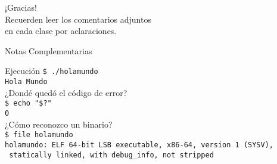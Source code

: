 \documentclass[aspectratio=169]{beamer}
\begin{document}

\begin{frame}[plain]
    \begin{center}
    \vspace{2cm}
    \huge ¡Gracias!\\
    \vspace{2cm}
    \normalsize Recuerden leer los comentarios adjuntos\\ en cada clase por aclaraciones.
    \end{center}
\end{frame}

\begin{frame}[plain]
    \begin{center}
    \vspace{2cm}
    \huge Notas Complementarias\\
    \vspace{2cm}
    \end{center}
\end{frame}

\begin{frame}[fragile,t]{Ejecución}
    \small
    \vspace{0.2cm}
        \verb|$ ./holamundo|\\
        \pause
        \vspace{0.2cm}
        \verb|Hola Mundo|\\
        \pause
    \vspace{0.7cm}
        \textcolor{verdeuca}{¿Dondé quedó el código de error?}\\
        \pause
        \vspace{0.2cm}
        \verb|$ echo "$?"|\\
        \pause
        \vspace{0.2cm}
        \verb|0|\\
        \pause
    \vspace{0.7cm}
        \textcolor{verdeuca}{¿Cómo reconozco un binario?}\\
        \pause
        \vspace{0.2cm}
        \verb|$ file holamundo|\\
        \pause
        \vspace{0.2cm}
        \verb|holamundo: ELF 64-bit LSB executable, x86-64, version 1 (SYSV),|\\
        \verb| statically linked, with debug_info, not stripped|\\
\end{frame}
\end{document}
